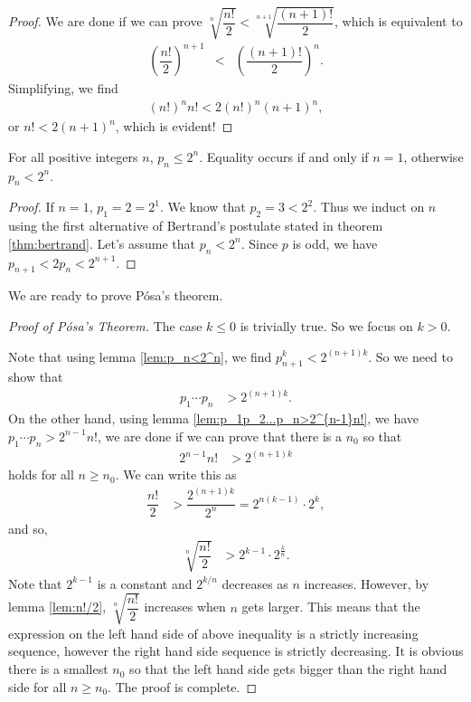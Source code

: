 \documentclass{subfiles}
\begin{document}
	\begin{proof}
		We are done if we can prove $\sqrt[n]{\dfrac{n!}{2}}<\sqrt[n+1]{\dfrac{(n+1)!}{2}}$, which is equivalent to
			\begin{eqnarray*}
				\left(\dfrac{n!}{2}\right)^{n+1}  & < & \left(\dfrac{(n+1)!}{2}\right)^n.
			\end{eqnarray*}
		Simplifying, we find
			\begin{eqnarray*}
			 (n!)^n n! <  2(n!)^n(n+1)^n,
			\end{eqnarray*}
		or $n!  <  2(n+1)^n$, which is evident!
	\end{proof}

	\begin{lemma}
		For all positive integers $n$, $p_{n}\leq 2^{n}$. Equality occurs if and only if $n=1$, otherwise $p_n<2^n$.\label{lem:p_n<2^n}
	\end{lemma}

	\begin{proof}
		If $n=1$, $p_1=2=2^1$. We know that $p_2=3<2^2$. Thus we induct on $n$ using the first alternative of Bertrand's postulate stated in theorem \autoref{thm:bertrand}. Let's assume that $p_n<2^n$. Since $p$ is odd, we have $p_{n+1}<2p_n<2^{n+1}$.
	\end{proof}

	We are ready to prove P\'{o}sa's theorem.

	\begin{proof}[Proof of P\'osa's Theorem]
		The case $k\leq0$ is trivially true. So we focus on $k>0$.

		Note that using lemma \eqref{lem:p_n<2^n}, we find $p_{n+1}^k<2^{(n+1)k}$. So we need to show that
			\begin{align*}
				p_1\cdots p_n & > 2^{(n+1)k}.
			\end{align*}
		On the other hand, using lemma \eqref{lem:p_1p_2...p_n>2^{n-1}n!}, we have $p_1\cdots p_n > 2^{n-1}n!$, we are done if we can prove that there is a $n_0$ so that
			\begin{align*}
				2^{n-1}n! & >2^{(n+1)k}
			\end{align*}
		holds for all $n\geq n_0$. We can write this as
			\begin{align*}
				\dfrac{n!}{2} & >\dfrac{2^{(n+1)k}}{2^n} =2^{n(k-1)}\cdot2^k,
			\end{align*}
		and so,
			\begin{align*}
				\sqrt[n]{\dfrac{n!}{2}}&>2^{k-1}\cdot2^{\frac{k}{n}}.
			\end{align*}
		Note that $2^{k-1}$ is a constant and $2^{k/n}$ decreases as $n$ increases. However, by lemma \eqref{lem:n!/2}, $\sqrt[n]{\dfrac{n!}{2}}$ increases when $n$ gets larger. This means that the expression on the left hand side of above inequality is a strictly increasing sequence, however the right hand side sequence is strictly decreasing. It is obvious there is a smallest $n_0$ so that the left hand side gets bigger than the right hand side for all $n\geq n_0$. The proof is complete.
	\end{proof}
\end{document}
